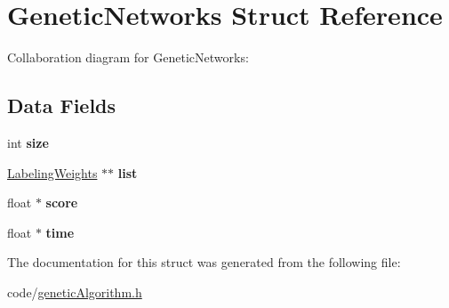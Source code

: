 \hypertarget{structGeneticNetworks}{}\section{Genetic\+Networks Struct Reference}
\label{structGeneticNetworks}


Collaboration diagram for Genetic\+Networks\+:
\subsection*{Data Fields}
\begin{DoxyCompactItemize}
\item 
int {\bfseries size}\hypertarget{structGeneticNetworks_a58af984cbe89812015b135a0b8e89bd0}{}\label{structGeneticNetworks_a58af984cbe89812015b135a0b8e89bd0}

\item 
\hyperlink{structLabelingWeights}{Labeling\+Weights} $\ast$$\ast$ {\bfseries list}\hypertarget{structGeneticNetworks_a3f09df9703bf0ae0799e9dda3ca9c58f}{}\label{structGeneticNetworks_a3f09df9703bf0ae0799e9dda3ca9c58f}

\item 
float $\ast$ {\bfseries score}\hypertarget{structGeneticNetworks_ab46d94723d6b3c8cdb8561195c3e4e56}{}\label{structGeneticNetworks_ab46d94723d6b3c8cdb8561195c3e4e56}

\item 
float $\ast$ {\bfseries time}\hypertarget{structGeneticNetworks_a601fe42e8f52a9f1b38e2f2e22054b3c}{}\label{structGeneticNetworks_a601fe42e8f52a9f1b38e2f2e22054b3c}

\end{DoxyCompactItemize}


The documentation for this struct was generated from the following file\+:\begin{DoxyCompactItemize}
\item 
code/\hyperlink{geneticAlgorithm_8h}{genetic\+Algorithm.\+h}\end{DoxyCompactItemize}
